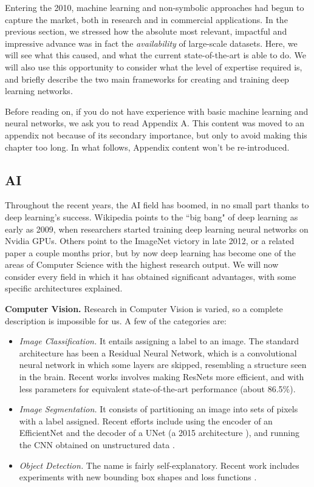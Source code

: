 \documentclass[../main.tex]{subfiles}
\begin{document}
Entering the 2010, machine learning and non-symbolic approaches had begun to capture the market, both in research and in commercial applications. In the previous section, we stressed how the absolute most relevant, impactful and impressive advance was in fact the \textit{availability} of large-scale datasets. Here, we will see what this caused, and what the current state-of-the-art is able to do. We will also use this opportunity to consider what the level of expertise required is, and briefly describe the two main frameworks for creating and training deep learning networks.

Before reading on, if you do not have experience with basic machine learning and neural networks, we ask you to read Appendix A. This content was moved to an appendix not because of its secondary importance, but only to avoid making this chapter too long. In what follows, Appendix content won't be re-introduced.

\subsection{AI}
Throughout the recent years, the AI field has boomed, in no small part thanks to deep learning's success. Wikipedia points to the ``big bang" of deep learning as early as 2009, when researchers started training deep learning neural networks on Nvidia GPUs. Others\cite{parloffWhyDeepLearning2016} point to the ImageNet victory in late 2012, or a related paper a couple months prior\cite{ciresanMulticolumnDeepNeural2012}, but by now deep learning has become one of the areas of Computer Science with the highest research output. We will now consider every field in which it has obtained significant advantages, with some specific architectures explained.

\vspace{4pt}
\textbf{Computer Vision.} Research in Computer Vision is varied, so a complete description is impossible for us. A few of the categories are:
\begin{itemize}
    \item \textit{Image Classification.} It entails assigning a label to an image. The standard architecture has been a Residual Neural Network, which is a convolutional neural network in which some layers are skipped, resembling a structure seen in the brain. Recent works involves making ResNets more efficient, and with less parameters for equivalent state-of-the-art performance (about 86.5\%)\cite{tanEfficientNetV2SmallerModels2021}\cite{brockHighPerformanceLargeScaleImage2021}.
    \item \textit{Image Segmentation.} It consists of partitioning an image into sets of pixels with a label assigned. Recent efforts include using the encoder of an EfficientNet and the decoder of a UNet (a 2015 architecture \cite{ronnebergerUNetConvolutionalNetworks2015}), and running the CNN obtained on unstructured data \cite{bahetiEffUNetNovelArchitecture2020}.
    \item \textit{Object Detection.} The name is fairly self-explanatory. Recent work includes experiments with new bounding box shapes and loss functions \cite{zhangVarifocalNetIoUawareDense2020}.
\end{itemize}
\end{document}
